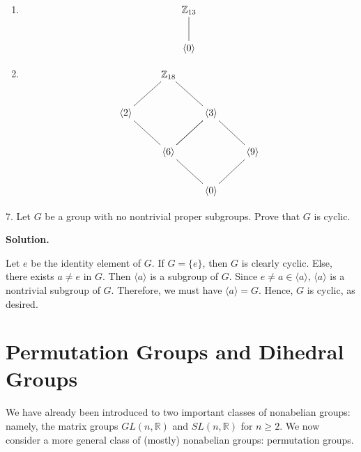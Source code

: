 \documentclass[10pt,]{book}
\theoremstyle{plain}
\theoremstyle{definition}
\theoremstyle{definition}
\theoremstyle{definition}
\theoremstyle{definition}
\numberwithin{equation}{section}
\def\Z{\mathbb{Z}}
\def\R{\mathbb{R}}
\begin{document}
\begin{exerciselist}
\begin{enumerate}[label=(\alph*)]
%
\item\hypertarget{li-319}{}
    {
\[\xymatrix{\Z_{13}\ar@{-}[d]\\ \langle0\rangle}\]
}

%
\item\hypertarget{li-320}{}
    {
\[\xymatrix{&\Z_{18}&&\\ \langle 2\rangle\ar@{-}[ur]\ar@{-}[dr]&&\langle 3\rangle\ar@{-}[ul]\ar@{-}[dl]&\\
&\langle 6 \rangle \ar@{-}[dr]\ar@{-}[ur]&& \langle 9 \rangle \ar@{-}[dl]\ar@{-}[ul]\\&& \langle 0 \rangle &}\]
}

%
\end{enumerate}
\item[7.]\hypertarget{exercise-40}{}
        Let \(G\) be a group with no nontrivial proper subgroups. Prove that \(G\) is cyclic.
\par\smallskip
\par\smallskip
\noindent\textbf{Solution.}\hypertarget{solution-40}{}\quad

      Let \(e\) be the identity
      element of \(G\). If \(G=\{e\}\), then \(G\) is clearly
      cyclic. Else, there exists \(a\neq e\) in \(G\). Then
      \(\langle a\rangle\) is a subgroup of \(G\). Since \(e\neq a\in
      \langle a\rangle\), \(\langle a\rangle\) is a nontrivial subgroup of \(G\). Therefore, we must have
      \(\langle a\rangle =G\). Hence, \(G\) is cyclic, as desired.
\end{exerciselist}
\typeout{************************************************}
\typeout{************************************************}
\chapter[{Permutation Groups and Dihedral Groups}]{Permutation Groups and Dihedral Groups}\label{perm}
\typeout{************************************************}
\typeout{************************************************}

      We have already been introduced to two important classes of
      nonabelian groups: namely, the matrix groups \(GL(n,\R)\) and
      \(SL(n,\R)\) for \(n\geq 2\). We now consider a more general class of
      (mostly) nonabelian groups: permutation groups.
\typeout{************************************************}
\typeout{************************************************}
\end{document}
